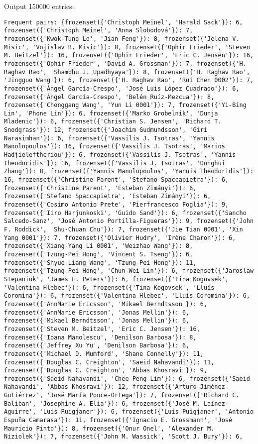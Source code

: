 \documentclass[11pt]{article}
\begin{document}
Output 150000 entries:
\begin{verbatim}
Frequent pairs: {frozenset({'Christoph Meinel', 'Harald Sack'}): 6, frozenset({'Christoph Meinel', 'Anna Slobodová'}): 7, frozenset({'Kwok-Tung Lo', 'Jian Feng'}): 8, frozenset({'Jelena V. Misic', 'Vojislav B. Misic'}): 8, frozenset({'Ophir Frieder', 'Steven M. Beitzel'}): 16, frozenset({'Ophir Frieder', 'Eric C. Jensen'}): 16, frozenset({'Ophir Frieder', 'David A. Grossman'}): 7, frozenset({'H. Raghav Rao', 'Shambhu J. Upadhyaya'}): 8, frozenset({'H. Raghav Rao', 'Jingguo Wang'}): 6, frozenset({'H. Raghav Rao', 'Rui Chen 0002'}): 7, frozenset({'Ángel García-Crespo', 'José Luis López Cuadrado'}): 6, frozenset({'Ángel García-Crespo', 'Belén Ruíz-Mezcua'}): 8, frozenset({'Chonggang Wang', 'Yun Li 0001'}): 7, frozenset({'Yi-Bing Lin', 'Phone Lin'}): 6, frozenset({'Marko Grobelnik', 'Dunja Mladenic'}): 6, frozenset({'Christian S. Jensen', 'Richard T. Snodgrass'}): 12, frozenset({'Joachim Gudmundsson', 'Giri Narasimhan'}): 6, frozenset({'Vassilis J. Tsotras', 'Yannis Manolopoulos'}): 16, frozenset({'Vassilis J. Tsotras', 'Marios Hadjieleftheriou'}): 6, frozenset({'Vassilis J. Tsotras', 'Yannis Theodoridis'}): 16, frozenset({'Vassilis J. Tsotras', 'Donghui Zhang'}): 8, frozenset({'Yannis Manolopoulos', 'Yannis Theodoridis'}): 16, frozenset({'Christine Parent', 'Stefano Spaccapietra'}): 6, frozenset({'Christine Parent', 'Esteban Zimányi'}): 6, frozenset({'Stefano Spaccapietra', 'Esteban Zimányi'}): 6, frozenset({'Cosimo Antonio Prete', 'Pierfrancesco Foglia'}): 9, frozenset({'Iiro Harjunkoski', 'Guido Sand'}): 6, frozenset({'Sancho Salcedo-Sanz', 'José Antonio Portilla-Figueras'}): 9, frozenset({'John F. Roddick', 'Shu-Chuan Chu'}): 7, frozenset({'Jie Tian 0001', 'Xin Yang 0001'}): 7, frozenset({'Olivier Hudry', 'Irène Charon'}): 6, frozenset({'Xiang-Yang Li 0001', 'Weizhao Wang'}): 8, frozenset({'Tzung-Pei Hong', 'Vincent S. Tseng'}): 6, frozenset({'Shyue-Liang Wang', 'Tzung-Pei Hong'}): 11, frozenset({'Tzung-Pei Hong', 'Chun-Wei Lin'}): 6, frozenset({'Jaroslaw Stepaniuk', 'James F. Peters'}): 6, frozenset({'Tina Kogovsek', 'Valentina Hlebec'}): 6, frozenset({'Tina Kogovsek', 'Lluís Coromina'}): 6, frozenset({'Valentina Hlebec', 'Lluís Coromina'}): 6, frozenset({'AnnMarie Ericsson', 'Mikael Berndtsson'}): 6, frozenset({'AnnMarie Ericsson', 'Jonas Mellin'}): 6, frozenset({'Mikael Berndtsson', 'Jonas Mellin'}): 6, frozenset({'Steven M. Beitzel', 'Eric C. Jensen'}): 16, frozenset({'Ioana Manolescu', 'Denilson Barbosa'}): 8, frozenset({'Jeffrey Xu Yu', 'Denilson Barbosa'}): 6, frozenset({'Michael D. Mumford', 'Shane Connelly'}): 11, frozenset({'Douglas C. Creighton', 'Saeid Nahavandi'}): 11, frozenset({'Douglas C. Creighton', 'Abbas Khosravi'}): 9, frozenset({'Saeid Nahavandi', 'Chee Peng Lim'}): 6, frozenset({'Saeid Nahavandi', 'Abbas Khosravi'}): 12, frozenset({'Arturo Jiménez-Gutiérrez', 'José María Ponce-Ortega'}): 7, frozenset({'Richard C. Baliban', 'Josephine A. Elia'}): 6, frozenset({'José M. Laínez-Aguirre', 'Luis Puigjaner'}): 6, frozenset({'Luis Puigjaner', 'Antonio Espuña Camarasa'}): 11, frozenset({'Ignacio E. Grossmann', 'José Mauricio Pinto'}): 8, frozenset({'Onur Onel', 'Alexander M. Niziolek'}): 7, frozenset({'John M. Wassick', 'Scott J. Bury'}): 6, 
\end{verbatim}
\end{document}
